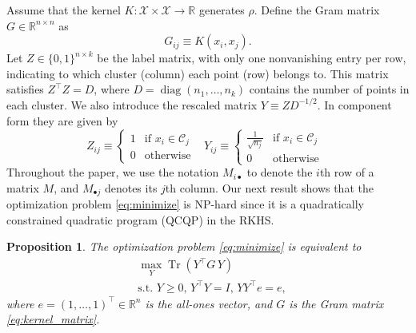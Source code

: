 \documentclass[twoside]{article}
\newtheorem{proposition}[theorem]{Proposition}
\DeclareMathOperator{\diag}{diag}
\DeclareMathOperator{\Tr}{Tr}
\newcommand\kk{K}
\newcommand\C{{\mathcal{C}}}
\newcommand\Zt{Y}
\newcommand\e{e}
\begin{document}
Assume that the kernel $\kk: \mathcal{X} \times \mathcal{X} \to \mathbb{R}$ 
generates $\rho$.  Define  the Gram matrix $G \in \mathbb{R}^{n\times n}$ as
\begin{equation}
\label{eq:kernel_matrix}
G_{ij} \equiv \kk(x_i,x_j).
\end{equation}
Let $Z \in \{ 0,1 \}^{n\times k}$ be the label matrix, 
with only one nonvanishing entry per row, 
indicating to which cluster (column)
each point (row) belongs to. This matrix satisfies
$Z^\top Z = D$, where  
$D = \diag( n_1,\dotsc, n_k )$  contains
the number of points in each cluster. We also introduce the rescaled
matrix  $Y \equiv Z D^{-1/2}$. In component form they are given by
\begin{equation}
\label{eq:label_matrix}
Z_{ij} \equiv \begin{cases}
1 & \mbox{if $x_i \in \C_j$ } \\
0 & \mbox{otherwise}
\end{cases} \
\Zt_{ij} \equiv \begin{cases}
\tfrac{1}{\sqrt{n_j}} & \mbox{if $x_i \in \C_j$ } \\
0 & \mbox{otherwise}
\end{cases}
\end{equation}
Throughout the paper, we use the notation $M_{i\bullet}$ to denote
the $i$th row of a matrix $M$, and $M_{\bullet j}$ denotes its $j$th column.
Our next result shows that the optimization problem \eqref{eq:minimize}
is NP-hard since
it is a quadratically constrained quadratic program (QCQP) in the RKHS.

\begin{proposition} 
\label{th:qcqp2}
The optimization problem \eqref{eq:minimize} is equivalent to
\begin{equation}
\label{eq:qcqp2}
\begin{split}
&\max_{\Zt} \Tr \left( \Zt^\top G \, \Zt \right) \\
&\mbox{s.t. $\Zt \ge 0$, $\Zt^\top \Zt = I$, 
$\Zt \Zt^\top \e = \e$},
\end{split}
\end{equation}
where $\e = (1,\dots,1)^\top \in \mathbb{R}^n$ is the all-ones vector,
and $G$ is the Gram matrix \eqref{eq:kernel_matrix}.
\end{proposition}
\end{document}
